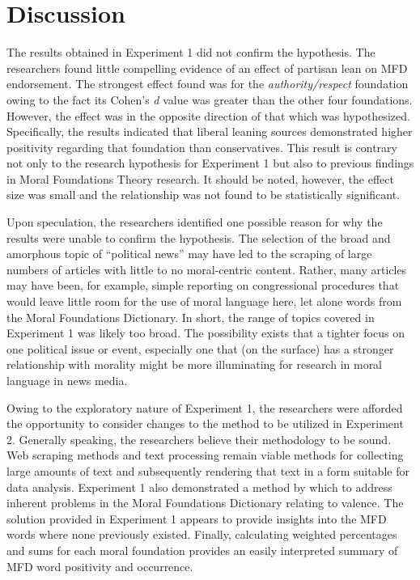 \documentclass[english,,man]{apa6}
\begin{document}
\section{Discussion}\label{discussion}

The results obtained in Experiment 1 did not confirm the hypothesis. The
researchers found little compelling evidence of an effect of partisan
lean on MFD endorsement. The strongest effect found was for the
\emph{authority/respect} foundation owing to the fact its Cohen's
\emph{d} value was greater than the other four foundations. However, the
effect was in the opposite direction of that which was hypothesized.
Specifically, the results indicated that liberal leaning sources
demonstrated higher positivity regarding that foundation than
conservatives. This result is contrary not only to the research
hypothesis for Experiment 1 but also to previous findings in Moral
Foundations Theory research. It should be noted, however, the effect
size was small and the relationship was not found to be statistically
significant.

Upon speculation, the researchers identified one possible reason for why
the results were unable to confirm the hypothesis. The selection of the
broad and amorphous topic of \enquote{political news} may have led to
the scraping of large numbers of articles with little to no
moral-centric content. Rather, many articles may have been, for example,
simple reporting on congressional procedures that would leave little
room for the use of moral language here, let alone words from the Moral
Foundations Dictionary. In short, the range of topics covered in
Experiment 1 was likely too broad. The possibility exists that a tighter
focus on one political issue or event, especially one that (on the
surface) has a stronger relationship with morality might be more
illuminating for research in moral language in news media.

Owing to the exploratory nature of Experiment 1, the researchers were
afforded the opportunity to consider changes to the method to be
utilized in Experiment 2. Generally speaking, the researchers believe
their methodology to be sound. Web scraping methods and text processing
remain viable methods for collecting large amounts of text and
subsequently rendering that text in a form suitable for data analysis.
Experiment 1 also demonstrated a method by which to address inherent
problems in the Moral Foundations Dictionary relating to valence. The
solution provided in Experiment 1 appears to provide insights into the
MFD words where none previously existed. Finally, calculating weighted
percentages and sums for each moral foundation provides an easily
interpreted summary of MFD word positivity and occurrence.
\end{document}
